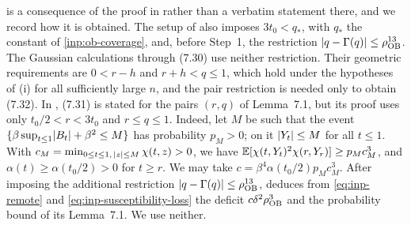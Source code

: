  is a consequence of the proof in
\cite[Section~7]{oai-barriers} rather than a verbatim statement there, and we
record how it is obtained. The setup of \cite[Section~7]{oai-barriers} also
imposes $3t_0<q_*$, with $q_*$ the constant of \cref{inp:ob-coverage}, and,
before Step~1, the restriction $\lvert q-\Gamma(q)\rvert\le\rho_{\rm OB}^{13}$. The
Gaussian calculations through (7.30) use neither restriction. Their geometric
requirements are $0<r-h$ and $r+h<q\le1$, which hold under the hypotheses of
(i) for all sufficiently large $n$, and the pair restriction is needed only to
obtain (7.32). In \cite[Section~7]{oai-barriers}, (7.31) is stated for the
pairs $(r,q)$ of Lemma~7.1, but its proof uses only $t_0/2<r<3t_0$ and
$r\le q\le1$. Indeed, let $M$ be such that the event
$\{\beta\sup_{t\le1}\lvert B_t\rvert+\beta^2\le M\}$ has probability $p_M>0$; on it
$\lvert Y_t\rvert\le M$ for all $t\le1$. With $c_M=\min_{0\le t\le1,\,\lvert z\rvert\le M}
\chi(t,z)>0$, we have $\mathbb E[\chi(t,Y_t)^2\chi(r,Y_r)]\ge p_Mc_M^3$, and
$\alpha(t)\ge\alpha(t_0/2)>0$ for $t\ge r$. We may take
$c=\beta^4\alpha(t_0/2)p_Mc_M^3$. After imposing the additional restriction
$\lvert q-\Gamma(q)\rvert\le\rho_{\rm OB}^{13}$, \cite{oai-barriers} deduces from
\eqref{eq:inp-remote} and \eqref{eq:inp-susceptibility-loss} the deficit
$c\delta^2\rho_{\rm OB}^3$ \cite[(7.32)]{oai-barriers} and the probability bound
of its Lemma~7.1. We use neither.

